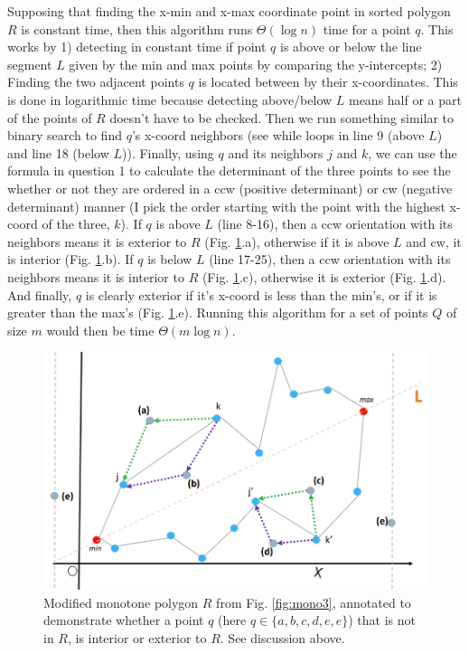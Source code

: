 \documentclass [12pt]{article}
\begin{document}
\begin{enumerate}[label=(\alph*)]
            Supposing that finding the x-min and x-max coordinate point in sorted polygon $R$ is constant time, then this algorithm runs $\Theta(\log n)$ time for a point $q$. This works by 1) detecting in constant time if point $q$ is above or below the line segment $L$ given by the min and max points by comparing the y-intercepts; 2) Finding the two adjacent points $q$ is located between by their x-coordinates. This is done in logarithmic time because detecting above/below $L$ means half or a part of the points of $R$ doesn't have to be checked. Then we run something similar to binary search to find $q$'s x-coord neighbors (see while loops in line 9 (above $L$) and line 18 (below $L$)). Finally, using $q$ and its neighbors $j$ and $k$, we can use the formula in question 1 to calculate the determinant of the three points to see the whether or not they are ordered in a ccw (positive determinant) or cw (negative determinant) manner (I pick the order starting with the point with the highest x-coord of the three, $k$). If $q$ is above $L$ (line 8-16), then a ccw orientation with its neighbors means it is exterior to $R$ (Fig. \ref{fig:3c1}.a), otherwise if it is above $L$ and cw, it is interior (Fig. \ref{fig:3c1}.b). If $q$ is below $L$ (line 17-25), then a ccw orientation with its neighbors means it is interior to $R$ (Fig. \ref{fig:3c1}.c), otherwise it is exterior (Fig. \ref{fig:3c1}.d). And finally, $q$ is clearly exterior if it's x-coord is less than the min's, or if it is greater than the max's (Fig. \ref{fig:3c1}.e). Running this algorithm for a set of points $Q$ of size $m$ would then be time $\Theta(m \log n)$.

            \begin{figure}[h]
                \centering
                \includegraphics[width=1\textwidth]{images/3c1.PNG}
                \caption{Modified monotone polygon $R$ from Fig. \ref{fig:mono3}, annotated to demonstrate whether a point $q$ (here $q \in \{a, b, c, d, e, e\}$) that is not in $R$, is interior or exterior to $R$. See discussion above.}
                \label{fig:3c1}
            \end{figure}



\end{enumerate}
\end{document}
